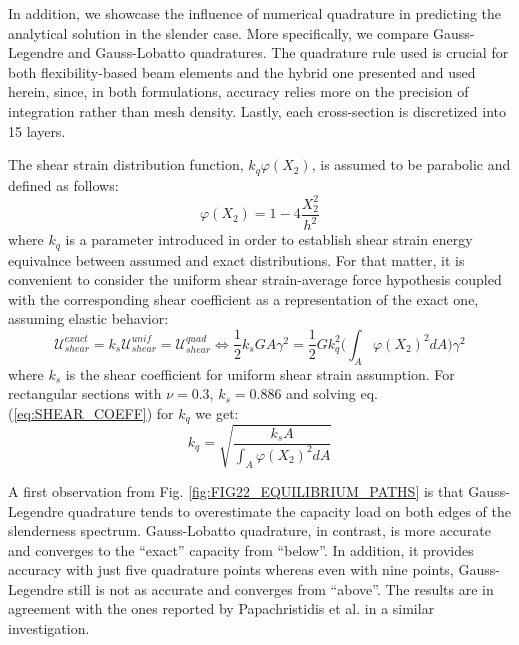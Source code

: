  In addition, we showcase the 
influence of numerical quadrature in predicting the analytical solution in the 
slender case. More specifically, we compare Gauss-Legendre and Gauss-Lobatto 
quadratures. The quadrature rule used is crucial for both flexibility-based 
beam elements and the hybrid one presented and used herein, since, in both 
formulations, accuracy relies more on the precision of integration rather than 
mesh density. Lastly, each cross-section is discretized into 15 layers.

The shear strain distribution function, $k_q\varphi(X_2)$, is assumed to be 
parabolic and defined as follows:
\begin{equation}
	\varphi(X_2) = 1-4\frac{X_2^2}{h^2}
	\label{eq:SHEAR_DISTR_FUN}
\end{equation}
\noindent where $k_q$ is a parameter introduced in order to establish shear 
strain energy equivalnce between assumed and exact distributions. For that 
matter, it is convenient to consider the uniform shear strain-average force 
hypothesis coupled with the corresponding shear coefficient as a representation 
of the exact one, assuming elastic behavior:
\begin{equation}
	\mathcal{U}_{shear}^{exact}=k_s\mathcal{U}_{shear}^{unif} = 
	\mathcal{U}_{shear}^{quad}\Longleftrightarrow 
	\frac{1}{2}k_sGA\gamma ^2=\frac{1}{2}G k_q^2\bigg(\int_A \varphi(X_2)^2 dA 
	\bigg) \gamma ^2
	\label{eq:SHEAR_COEFF}
\end{equation}
\noindent where $k_s$ is the shear coefficient for uniform shear strain 
assumption. For rectangular sections with $\nu=0.3$, 
$k_s=0.886$ and solving eq. (\ref{eq:SHEAR_COEFF}) for $k_q$ we 
get:
\begin{equation}
	k_q = \sqrt{\frac{k_s A}{\int_A \varphi(X_2)^2 dA}}
	\label{eq:QUAD_COEFF}
\end{equation}

A first observation from Fig. \ref{fig:FIG22_EQUILIBRIUM_PATHS} is that 
Gauss-Legendre quadrature tends to overestimate the capacity load on both edges 
of the slenderness spectrum. Gauss-Lobatto quadrature, in contrast, is 
more accurate and converges to the ``exact'' capacity from ``below''. In 
addition, it provides accuracy with just five quadrature points whereas even 
with nine points, Gauss-Legendre still is not as accurate and converges from 
``above''. 
The results are in agreement with the ones reported by Papachristidis et 
al.\cite{Papachristidis2010} in a similar investigation.

